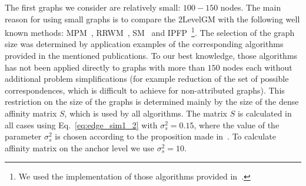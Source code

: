The first graphs we consider are relatively small: $100-150$ nodes. The main reason for using small graphs is to compare the 2LevelGM with the following well known methods: MPM~\cite{Cho2014_Haystack}, RRWM~\cite{Cho2010_RRWM}, SM~\cite{Leordeanu2005_SM} and IPFP~\cite{Leordeanu2009_IPFP}\footnote{We used the implementation of those algorithms provided in~\cite{code_MPM}.}. The selection of the graph size was determined by application examples of the corresponding algorithms provided in the mentioned publications. To our best knowledge, those algorithms has not been applied directly to graphs with more than $150$ nodes each without additional problem simplifications (for example reduction of the set of possible correspondences, which is difficult to achieve for non-attributed graphs). This restriction on the size of the graphs is determined mainly by the size of the dense affinity matrix $S$, which is used by all algorithms. The matrix $S$ is calculated in all cases using Eq.~\eqref{eq:edge_sim1_2} with $\sigma_s^2=0.15$, where the value of the parameter $\sigma_s^2$ is chosen according to the proposition made in~\cite{Cho2010_RRWM}. To calculate affinity matrix on the anchor level we use $\sigma_s^2=10$. 

